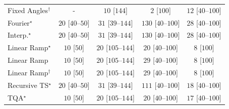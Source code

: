 \begin{tabular}{l|cccc|}
Fixed Angles$^\dagger$ & {\cellcolor[HTML]{000000}} \color[HTML]{F1F1F1} {\cellcolor{white}} \color{black} - & {\cellcolor[HTML]{F6FCF4}} \color[HTML]{000000} $10$ [$144$] & {\cellcolor[HTML]{F7FCF5}} \color[HTML]{000000} $2$ [$100$] & {\cellcolor[HTML]{F5FBF3}} \color[HTML]{000000} $12$ [$40$--$100$] \\
Fourier$^\star$ & {\cellcolor[HTML]{F4FBF2}} \color[HTML]{000000} $20$ [$40$--$50$] & {\cellcolor[HTML]{F2FAEF}} \color[HTML]{000000} $31$ [$39$--$144$] & {\cellcolor[HTML]{DCF2D7}} \color[HTML]{000000} $130$ [$40$--$100$] & {\cellcolor[HTML]{F2FAF0}} \color[HTML]{000000} $28$ [$40$--$100$] \\
Interp.$^\star$ & {\cellcolor[HTML]{F4FBF2}} \color[HTML]{000000} $20$ [$40$--$50$] & {\cellcolor[HTML]{F2FAEF}} \color[HTML]{000000} $31$ [$39$--$144$] & {\cellcolor[HTML]{DCF2D7}} \color[HTML]{000000} $130$ [$40$--$100$] & {\cellcolor[HTML]{F2FAF0}} \color[HTML]{000000} $28$ [$40$--$100$] \\
Linear Ramp$^\star$ & {\cellcolor[HTML]{F6FCF4}} \color[HTML]{000000} $10$ [$50$] & {\cellcolor[HTML]{F4FBF2}} \color[HTML]{000000} $20$ [$105$--$144$] & {\cellcolor[HTML]{F4FBF2}} \color[HTML]{000000} $20$ [$40$--$100$] & {\cellcolor[HTML]{F6FCF4}} \color[HTML]{000000} $8$ [$100$] \\
Linear Ramp & {\cellcolor[HTML]{F6FCF4}} \color[HTML]{000000} $10$ [$50$] & {\cellcolor[HTML]{F4FBF2}} \color[HTML]{000000} $20$ [$105$--$144$] & {\cellcolor[HTML]{F2FAF0}} \color[HTML]{000000} $29$ [$40$--$100$] & {\cellcolor[HTML]{F6FCF4}} \color[HTML]{000000} $8$ [$100$] \\
Linear Ramp$^\dagger$ & {\cellcolor[HTML]{F6FCF4}} \color[HTML]{000000} $10$ [$50$] & {\cellcolor[HTML]{F4FBF2}} \color[HTML]{000000} $20$ [$105$--$144$] & {\cellcolor[HTML]{F2FAF0}} \color[HTML]{000000} $29$ [$40$--$100$] & {\cellcolor[HTML]{F6FCF4}} \color[HTML]{000000} $8$ [$100$] \\
Recursive TS$^\star$ & {\cellcolor[HTML]{F4FBF2}} \color[HTML]{000000} $20$ [$40$--$50$] & {\cellcolor[HTML]{F2FAEF}} \color[HTML]{000000} $31$ [$39$--$144$] & {\cellcolor[HTML]{E2F4DD}} \color[HTML]{000000} $111$ [$40$--$100$] & {\cellcolor[HTML]{F4FBF2}} \color[HTML]{000000} $18$ [$40$--$100$] \\
TQA$^\star$ & {\cellcolor[HTML]{F6FCF4}} \color[HTML]{000000} $10$ [$50$] & {\cellcolor[HTML]{F4FBF2}} \color[HTML]{000000} $20$ [$105$--$144$] & {\cellcolor[HTML]{F4FBF2}} \color[HTML]{000000} $20$ [$40$--$100$] & {\cellcolor[HTML]{F5FBF2}} \color[HTML]{000000} $17$ [$40$--$100$] \\

\end{tabular}
